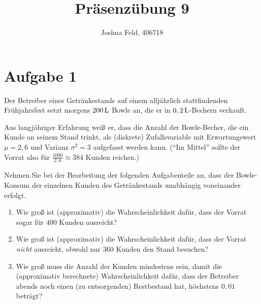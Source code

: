 \documentclass{exercise}
\institute{Institut für Statistik und Wirtschaftsmathematik}
\title{Präsenzübung 9}
\author{Joshua Feld, 406718}
\begin{document}
    \maketitle


    \section*{Aufgabe 1}
    
    \begin{problem}
        Der Betreiber eines Getränkestands auf einem alljährlich stattfindenden Frühjahrsfest setzt morgens \(200\,\si{\liter}\) Bowle an, die er in \(0,2\,\si{\liter}\)-Bechern verkauft.
        
        Aus langjähriger Erfahrung weiß er, dass die Anzahl der Bowle-Becher, die ein Kunde an seinem Stand trinkt, als (diskrete) Zufallsvariable mit Erwartungswert \(\mu = 2,6\) und Varianz \(\sigma^2 = 3\) aufgefasst werden kann.
        (``Im Mittel'' sollte der Vorrat also für \(\frac{1000}{2,6} \approx 384\) Kunden reichen.)
        
        Nehmen Sie bei der Bearbeitung der folgenden Aufgabenteile an, dass der Bowle-Konsum der einzelnen Kunden des Getränkestands unabhängig voneinander erfolgt.
        \begin{enumerate}
            \item Wie groß ist (approximativ) die Wahrscheinlichkeit dafür, dass der Vorrat sogar für \(400\) Kunden ausreicht?
            \item Wie groß ist (approximativ) die Wahrscheinlichkeit dafür, dass der Vorrat \emph{nicht} ausreicht, obwohl nur \(360\) Kunden den Stand besuchen?
            \item Wie groß muss die Anzahl der Kunden mindestens sein, damit die (approximativ berechnete) Wahrscheinlichkeit dafür, dass der Betreiber abends noch einen (zu entsorgenden) Restbestand hat, höchstens \(0,01\) beträgt?
        \end{enumerate}
    \end{problem}
    
\end{document}
